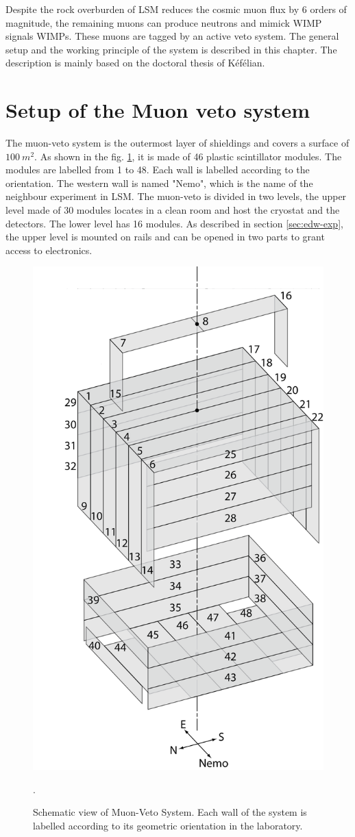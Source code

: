 Despite the rock overburden of LSM reduces the cosmic muon flux by 6 orders of magnitude, the remaining muons can produce neutrons and mimick WIMP signals WIMPs. These muons are tagged by an active veto system. The general setup and the working principle of the system is described in this chapter. The description is mainly based on the doctoral thesis of K{\'{e}}f{\'{e}}lian. \cite{Kef16}



\section{Setup of the Muon veto system}
\label{sec:muon-setup}

The muon-veto system is the outermost layer of shieldings and covers a surface of $\SI{100}{m^{2}}$. As shown in the fig. \ref{fig:muon-setup}, it is made of 46 plastic scintillator modules. The modules are labelled from 1 to 48. Each wall is labelled according to the orientation. The western wall is named "Nemo", which is the name of the neighbour experiment in LSM.
The muon-veto is divided in two levels, the upper level made of 30 modules locates in a clean room and host the cryostat and the detectors. The lower level has 16 modules. As described in section \ref{sec:edw-exp}, the upper level is mounted on rails and can be opened in two parts to grant access to electronics.

\begin{figure}[ht!]
  \centering
  \includegraphics[width=0.5\textwidth{}]{./fig/Veto.png}
  \caption{Schematic view of Muon-Veto System. Each wall of the system is labelled according to its geometric orientation in the laboratory. }.
  \label{fig:muon-setup}
\end{figure}

